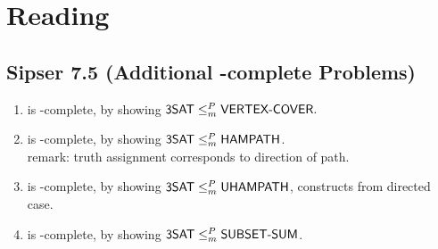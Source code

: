 \documentclass{article}
\begin{document}
\section{Reading}

\subsection{Sipser 7.5 (Additional \NP-complete Problems)}

\begin{enumerate}
  \item {} is \NP-complete, by showing \( \text{\sf 3SAT} \leq_m^P \text{\sf VERTEX-COVER}. \)
  \item {} is \NP-complete, by showing \( \text{\sf 3SAT} \leq_m^P \text{\sf HAMPATH} \). \\
  remark: truth assignment corresponds to direction of path.
  \item {} is \NP-complete, by showing \( \text{\sf 3SAT} \leq_m^P \text{\sf UHAMPATH} \), constructs from directed case.
  \item {} is \NP-complete, by showing \( \text{\sf 3SAT} \leq_m^P \text{\sf SUBSET-SUM} \).
\end{enumerate}
\end{document}
